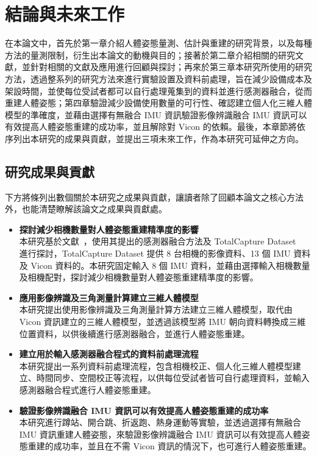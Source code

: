 \chapter{結論與未來工作}
\fontsize{12pt}{18pt}\selectfont

在本論文中，首先於第一章介紹人體姿態量測、估計與重建的研究背景，以及每種方法的量測限制，衍生出本論文的動機與目的；接著於第二章介紹相關的研究文獻，並針對相關的文獻及應用進行回顧與探討；再來於第三章本研究所使用的研究方法，透過整系列的研究方法來進行實驗設置及資料前處理，旨在減少設備成本及架設時間，並使每位受試者都可以自行處理蒐集到的資料並進行感測器融合，從而重建人體姿態；第四章驗證減少設備使用數量的可行性、確認建立個人化三維人體模型的準確度，並藉由選擇有無融合 IMU 資訊驗證影像辨識融合 IMU 資訊可以有效提高人體姿態重建的成功率，並且解除對 Vicon 的依賴。最後，本章節將依序列出本研究的成果與貢獻，並提出三項未來工作，作為本研究可延伸之方向。

\section{研究成果與貢獻}
下方將條列出數個關於本研究之成果與貢獻，讓讀者除了回顧本論文之核心方法外，也能清楚瞭解該論文之成果與貢獻處。

\begin{itemize}
    \item \textbf{探討減少相機數量對人體姿態重建精準度的影響}
    \\ 本研究基於文獻~\cite{Zhang_2020_CVPR}，使用其提出的感測器融合方法及 TotalCapture Dataset ~\cite{Trumble:BMVC:2017} 進行探討，TotalCapture Dataset 提供 8 台相機的影像資料、13 個 IMU 資料及 Vicon 資料的。本研究固定輸入 8 個 IMU 資料，並藉由選擇輸入相機數量及相機配對，探討減少相機數量對人體姿態重建精準度的影響。
    \clearpage
    \item \textbf{應用影像辨識及三角測量計算建立三維人體模型}
    \\ 本研究提出使用影像辨識及三角測量計算方法建立三維人體模型，取代由 Vicon 資訊建立的三維人體模型，並透過該模型將 IMU 朝向資料轉換成三維位置資料，以供後續進行感測器融合，並進行人體姿態重建。
    \item \textbf{建立用於輸入感測器融合程式的資料前處理流程}
    \\ 本研究提出一系列資料前處理流程，包含相機校正、個人化三維人體模型建立、時間同步、空間校正等流程，以供每位受試者皆可自行處理資料，並輸入感測器融合程式進行人體姿態重建。
    \item \textbf{驗證影像辨識融合 IMU 資訊可以有效提高人體姿態重建的成功率}
    \\ 本研究進行蹲站、開合跳、折返跑、熱身運動等實驗，並透過選擇有無融合 IMU 資訊重建人體姿態，來驗證影像辨識融合 IMU 資訊可以有效提高人體姿態重建的成功率，並且在不需 Vicon 資訊的情況下，也可進行人體姿態重建。
\end{itemize}

